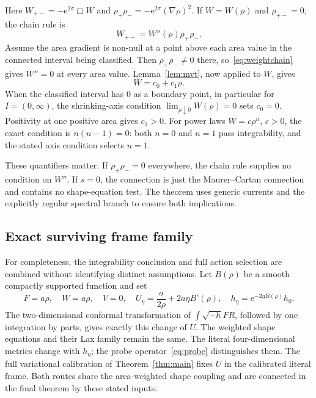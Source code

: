 \documentclass[11pt]{article}
\newcommand{\vol}{\sqrt{-h}}
\newcommand{\e}{\mathrm e}
\begin{document}
Here $W_{+-}=-\e^{2\sigma}\Box W$ and $\rho_+\rho_-=-\e^{2\sigma}(\nabla\rho)^2$. If $W=W(\rho)$ and $\rho_{+-}=0$, the chain rule is
\begin{equation}\label{eq:weightchain}
 W_{+-}=W''(\rho)\rho_+\rho_-.
\end{equation}
Assume the area gradient is non-null at a point above each area value in the connected interval being classified. Then $\rho_+\rho_-\ne0$ there, so~\eqref{eq:weightchain} gives $W''=0$ at every area value. Lemma~\ref{lem:mvt}, now applied to $W$, gives
\begin{equation}
 W=c_0+c_1\rho.
\end{equation}
When the classified interval has $0$ as a boundary point, in particular for $I=(0,\infty)$, the shrinking-axis condition $\lim_{\rho\downarrow0}W(\rho)=0$ sets $c_0=0$. Positivity at one positive area gives $c_1>0$. For power laws $W=c\rho^n$, $c>0$, the exact condition is $n(n-1)=0$: both $n=0$ and $n=1$ pass integrability, and the stated axis condition selects $n=1$.

These quantifiers matter. If $\rho_+\rho_-=0$ everywhere, the chain rule supplies no condition on $W''$. If $s=0$, the connection is just the Maurer--Cartan connection and contains no shape-equation test. The theorem uses generic currents and the explicitly regular spectral branch to ensure both implications.

\subsection{Exact surviving frame family}

For completeness, the integrability conclusion and full action selection are combined without identifying distinct assumptions. Let $B(\rho)$ be a smooth compactly supported function and set
\begin{equation}
 F=a\rho,\quad W=a\rho,\quad V=0,\quad
 U_\eta=\frac a{2\rho}+2a\eta B'(\rho),\quad
 h_\eta=\e^{-2\eta B(\rho)}h_0.
\end{equation}
The two-dimensional conformal transformation of $\int\vol FR$, followed by one integration by parts, gives exactly this change of $U$. The weighted shape equations and their Lax family remain the same. The literal four-dimensional metrics change with $h_\eta$; the probe operator~\eqref{eq:probe} distinguishes them. The full variational calibration of Theorem~\ref{thm:main} fixes $U$ in the calibrated literal frame. Both routes share the area-weighted shape coupling and are connected in the final theorem by these stated inputs.
\end{document}
